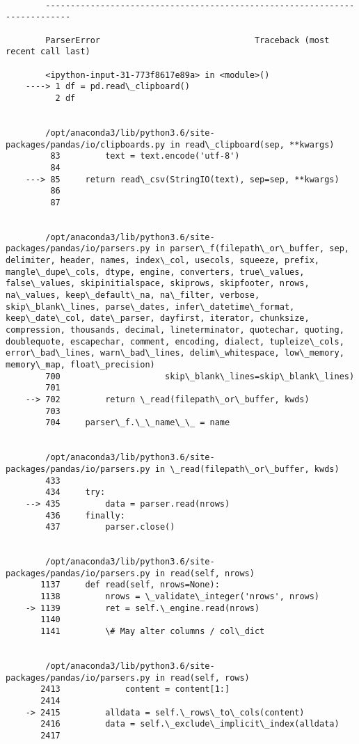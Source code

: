 \documentclass[11pt]{article}
\begin{document}
    \begin{Verbatim}[commandchars=\\\{\}]

        ---------------------------------------------------------------------------

        ParserError                               Traceback (most recent call last)

        <ipython-input-31-773f8617e89a> in <module>()
    ----> 1 df = pd.read\_clipboard()
          2 df


        /opt/anaconda3/lib/python3.6/site-packages/pandas/io/clipboards.py in read\_clipboard(sep, **kwargs)
         83         text = text.encode('utf-8')
         84 
    ---> 85     return read\_csv(StringIO(text), sep=sep, **kwargs)
         86 
         87 


        /opt/anaconda3/lib/python3.6/site-packages/pandas/io/parsers.py in parser\_f(filepath\_or\_buffer, sep, delimiter, header, names, index\_col, usecols, squeeze, prefix, mangle\_dupe\_cols, dtype, engine, converters, true\_values, false\_values, skipinitialspace, skiprows, skipfooter, nrows, na\_values, keep\_default\_na, na\_filter, verbose, skip\_blank\_lines, parse\_dates, infer\_datetime\_format, keep\_date\_col, date\_parser, dayfirst, iterator, chunksize, compression, thousands, decimal, lineterminator, quotechar, quoting, doublequote, escapechar, comment, encoding, dialect, tupleize\_cols, error\_bad\_lines, warn\_bad\_lines, delim\_whitespace, low\_memory, memory\_map, float\_precision)
        700                     skip\_blank\_lines=skip\_blank\_lines)
        701 
    --> 702         return \_read(filepath\_or\_buffer, kwds)
        703 
        704     parser\_f.\_\_name\_\_ = name


        /opt/anaconda3/lib/python3.6/site-packages/pandas/io/parsers.py in \_read(filepath\_or\_buffer, kwds)
        433 
        434     try:
    --> 435         data = parser.read(nrows)
        436     finally:
        437         parser.close()


        /opt/anaconda3/lib/python3.6/site-packages/pandas/io/parsers.py in read(self, nrows)
       1137     def read(self, nrows=None):
       1138         nrows = \_validate\_integer('nrows', nrows)
    -> 1139         ret = self.\_engine.read(nrows)
       1140 
       1141         \# May alter columns / col\_dict


        /opt/anaconda3/lib/python3.6/site-packages/pandas/io/parsers.py in read(self, rows)
       2413             content = content[1:]
       2414 
    -> 2415         alldata = self.\_rows\_to\_cols(content)
       2416         data = self.\_exclude\_implicit\_index(alldata)
       2417 



\end{Verbatim}
\end{document}
